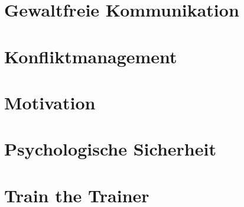 \documentclass[a4paper,openany,twoside,titlepage,10pt,headsepline]{scrbook}
\begin{document}
    \chapter{Gewaltfreie Kommunikation}
    
    
    
    
    
    
    
    
    
    
    
    
    
    
    
    
    
    
    
    
    


    \chapter{Konfliktmanagement}
    
    
    
    
    
    
    
    
    
    


    \chapter{Motivation}
    
    
    
    
    


    \chapter{Psychologische Sicherheit}
    
    
    
    
    
    


    \chapter{Train the Trainer}
    
    
    
    
    
    
    
    

    \backmatter

    

    

    \printindex
\end{document}
